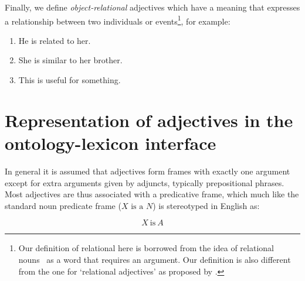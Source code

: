 \documentclass[11pt]{article}
\begin{document}
Finally, we define \emph{object-relational} adjectives which have a meaning 
that expresses a relationship between two individuals or events\footnote{Our definition of relational here is borrowed from the idea of
    relational nouns~\cite{de1988interpretation} as a word that requires an argument. Our definition is also different from the one for `relational adjectives' as proposed by \cite{morzycki2013nonscales}.}, for example:

\begin{enumerate}
\item He is related to her.
\item She is similar to her brother. 
\item This is useful for something. 
\end{enumerate}


\section{Representation of adjectives in the ontology-lexicon interface}

In general it is assumed that adjectives form frames with exactly one argument 
except for extra arguments given by adjuncts, typically prepositional phrases. 
Most adjectives are thus associated with a predicative frame, which much
like the standard noun predicate frame ($X\text{ is a }N$) is stereotyped in English as:

\vspace{-1.0em}
$$X\mathrm{~is~}A$$
\vspace{-1.5em}
\end{document}
